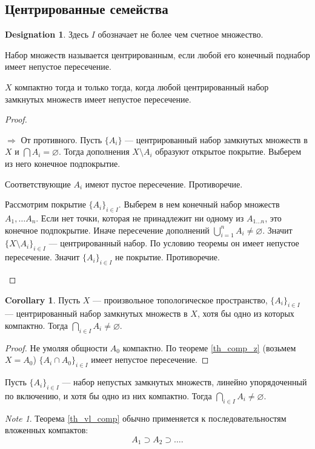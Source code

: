 \documentclass[11pt]{book}
\theoremstyle{definition}
\theoremstyle{plain}
\theoremstyle{plain}
\theoremstyle{definition}
\newtheorem*{cor}{Corollary}
\newtheorem*{name}{Designation}
\theoremstyle{remark}
\newtheorem*{note}{Note}
\begin{document}
\subsection{Центрированные семейства}
\begin{name}
    Здесь $ I$ обозначает не более чем счетное множество.
\end{name}
\begin{defn}
    Набор множеств называется  {\sf центрированным}, если любой его конечный поднабор имеет непустое пересечение.
\end{defn}
\begin{thm}\label{th_comp_z}
    $ X$ компактно тогда и только тогда, когда любой центрированный набор замкнутых множеств имеет непустое пересечение.
\end{thm}
\begin{proof}
    $ $
    \begin{description}
	\item $ \boxed{ \Longrightarrow }$ От противного. Пусть $ \{A_i\}$ --- центрированный набор замкнутых множеств в $ X$ и  $ \bigcap A_i= \varnothing $. Тогда дополнения $ X \setminus A_i$ образуют открытое покрытие. Выберем из него конечное подпокрытие.

	    Соответствующие $ A_i$ имеют пустое пересечение.  Противоречие.
	\item \boxed {\Longrightarrow} Рассмотрим покрытие $ \{A_i\}_{i \in I}$. Выберем в нем конечный набор множеств $ A_1, \ldots A_n$. Если нет точки, которая не принадлежит ни одному из $ A_{1 \ldots  n}$, это конечное подпокрытие. Иначе пересечение дополнений $ \bigcup_{i=1}^{n} A_i \ne \varnothing$. Значит $ \{X \setminus A_i\}_{i \in I}$ --- центрированный набор. По условию теоремы он имеет непустое пересечение. Значит $ \{A_i\}_{i \in I} $ не покрытие. Противоречие.
    \end{description}
\end{proof}
\begin{cor}
    Пусть $ X$ --- произвольное  топологическое пространство, $ \{A_i\}_{i \in I}$ --- центрированный набор замкнутых множеств в $ X$, хотя бы одно из которых компактно.
    Тогда  $ \bigcap_{i \in  I} A_i \ne \varnothing$.
\end{cor}
\begin{proof}
    Не умоляя общности $ A_0$ компактно. По теореме \ref{th_comp_z} (возьмем $ X=A_0$)  $ \{A_i \cap A_0\}_{i \in  I}$ имеет непустое пересечение.
\end{proof}
\begin{thm}\label{th_vl_comp}
    Пусть $ \{A_i\}_{i \in  I}$ --- набор непустых замкнутых множеств, линейно упорядоченный по включению, и хотя бы одно из них компактно.
    Тогда $ \bigcap_{i \in  I} A_i \ne \varnothing $.
\end{thm}
\begin{note}
    Теорема \ref{th_vl_comp} обычно применяется к последовательностям вложенных компактов:
    \[
	A_1 \supset A_2 \supset \ldots
    .\]
\end{note}
\end{document}
